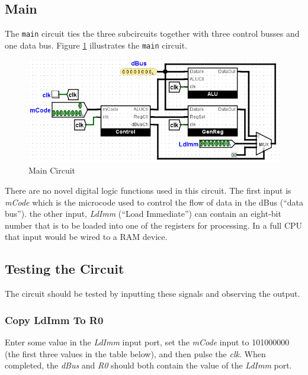 \subsection{Main}

The \lstinline[columns=fixed]|main| circuit ties the three subcircuits together with three control busses and one data bus. Figure \ref{fig:proc-06} illustrates the \lstinline[columns=fixed]|main| circuit.

\begin{figure}[H]
	\centering
	\includegraphics[width=\maxwidth{.95\linewidth}]{gfx/proc-06}
	\caption{Main Circuit}
	\label{fig:proc-06}
\end{figure}

There are no novel digital logic functions used in this circuit. The first input is \textit{mCode} which is the microcode used to control the flow of data in the dBus (``data bus''). the other input, \textit{LdImm} (``Load Immediate'') can contain an eight-bit number that is to be loaded into one of the registers for processing. In a full \ac{CPU} that input would be wired to a \ac{RAM} device.

\subsection{Testing the Circuit}

The circuit should be tested by inputting these signals and observing the output.

\subsubsection{Copy LdImm To R0}
Enter some value in the \textit{LdImm} input port, set the \textit{mCode} input to 101000000 (the first three values in the table below), and then pulse the \textit{clk}. When completed, the \textit{dBus} and \textit{R0} should both contain the value of the \textit{LdImm} port.

